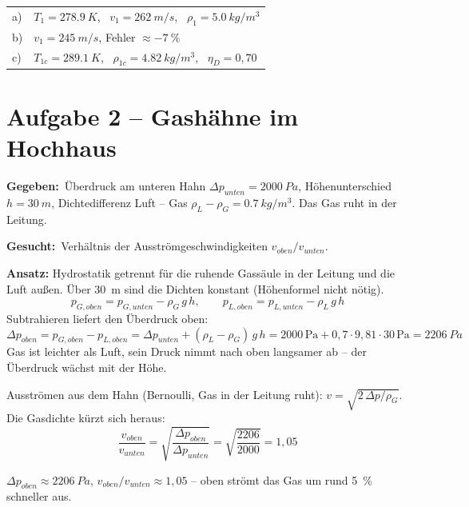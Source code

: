 \documentclass[11pt,a4paper]{article}
\newcommand{\gegeben}{\textbf{Gegeben:}\ }
\newcommand{\gesucht}{\textbf{Gesucht:}\ }
\begin{document}
\begin{ergebnis}
\begin{tabular}{@{}ll@{}}
a) & $T_1 = \SI{278.9}{K}$, \ $v_1 = \SI{262}{m/s}$, \ $\rho_1 = \SI{5.0}{kg/m^3}$ \\
b) & $v_1 = \SI{245}{m/s}$, Fehler $\approx \SI{-7}{\percent}$ \\
c) & $T_{1c} = \SI{289.1}{K}$, \ $\rho_{1c} = \SI{4.82}{kg/m^3}$, \ $\eta_D = 0{,}70$
\end{tabular}
\end{ergebnis}

\section{Aufgabe 2 -- Gashähne im Hochhaus}

\begin{bild}

\end{bild}

\gegeben Überdruck am unteren Hahn $\Delta p_{unten} = \SI{2000}{Pa}$, Höhenunterschied $h = \SI{30}{m}$, Dichtedifferenz Luft -- Gas $\rho_L - \rho_G = \SI{0.7}{kg/m^3}$. Das Gas ruht in der Leitung.

\gesucht Verhältnis der Ausströmgeschwindigkeiten $v_{oben}/v_{unten}$.

\textbf{Ansatz:} Hydrostatik getrennt für die ruhende Gassäule in der Leitung und die Luft außen. Über \SI{30}{m} sind die Dichten konstant (Höhenformel nicht nötig).
\[
p_{G,oben} = p_{G,unten} - \rho_G\,g\,h,
\qquad
p_{L,oben} = p_{L,unten} - \rho_L\,g\,h
\]
Subtrahieren liefert den Überdruck oben:
\[
\Delta p_{oben} = p_{G,oben} - p_{L,oben} = \Delta p_{unten} + (\rho_L - \rho_G)\,g\,h = 2000\,\mathrm{Pa} + 0{,}7\cdot 9{,}81\cdot 30\,\mathrm{Pa} = \SI{2206}{Pa}
\]
Gas ist leichter als Luft, sein Druck nimmt nach oben langsamer ab -- der Überdruck wächst mit der Höhe.

Ausströmen aus dem Hahn (Bernoulli, Gas in der Leitung ruht): $v = \sqrt{2\,\Delta p/\rho_G}$. Die Gasdichte kürzt sich heraus:
\[
\frac{v_{oben}}{v_{unten}} = \sqrt{\frac{\Delta p_{oben}}{\Delta p_{unten}}} = \sqrt{\frac{2206}{2000}} = 1{,}05
\]

\begin{ergebnis}
$\Delta p_{oben} \approx \SI{2206}{Pa}$, \quad $v_{oben}/v_{unten} \approx 1{,}05$ -- oben strömt das Gas um rund \SI{5}{\percent} schneller aus.
\end{ergebnis}
\end{document}
